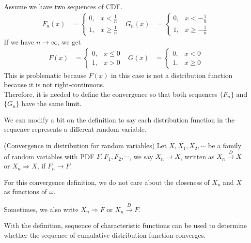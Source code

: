\documentclass{huhtakm-template-book}
\begin{document}
\begin{eg}
    Assume we have two sequences of CDF.
    \begin{align*}
        F_{n}(x)&=\begin{cases}
            0, &x<\frac{1}{n}\\
            1, & x\geq\frac{1}{n}
        \end{cases} & G_{n}(x)&=\begin{cases}
            0, &x<-\frac{1}{n}\\
            1, & x\geq-\frac{1}{n}
        \end{cases}
    \end{align*}
    If we have $n\to\infty$, we get
    \begin{align*}
        F(x)&=\begin{cases}
            0, &x\leq 0\\
            1, &x>0
        \end{cases} & G(x)&=\begin{cases}
            0, &x<0\\
            1, &x\geq 0
        \end{cases}
    \end{align*}
    This is problematic because $F(x)$ in this case is not a distribution function because it is not right-continuous.\\
    Therefore, it is needed to define the convergence so that both sequences $\{F_{n}\}$ and $\{G_{n}\}$ have the same limit.
\end{eg}
We can modify a bit on the definition to say each distribution function in the sequence represents a different random variable.
\begin{defn}(Convergence in distribution for random variables)
    Let $X,X_{1},X_{2},\cdots$ be a family of random variables with PDF $F,F_{1},F_{2},\cdots$, we say $X_{n}\to X$, written as $X_{n}\xrightarrow{D}X$ or $X_{n}\Rightarrow X$, if $F_{n}\to F$.
\end{defn}
\begin{rem}
    For this convergence definition, we do not care about the closeness of $X_{n}$ and $X$ as functions of $\omega$.
\end{rem}
\begin{rem}
    Sometimes, we also write $X_{n}\Rightarrow F$ or $X_{n}\xrightarrow{D}F$.
\end{rem}
With the definition, sequence of characteristic functions can be used to determine whether the sequence of cumulative distribution function converges.
\end{document}
